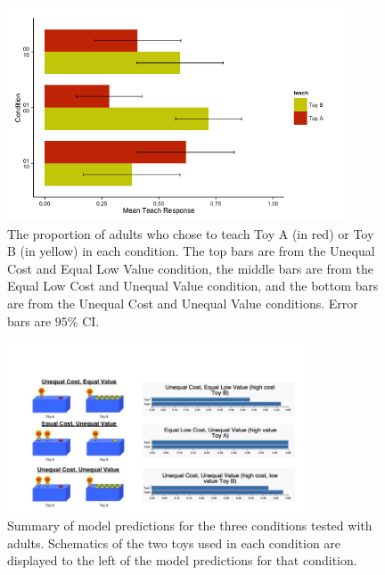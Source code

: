 \documentclass[10pt,letterpaper]{article}
\begin{document}
\begin{figure}[ht]
\begin{center}
\includegraphics[width=10cm]{cleanHorizontalBarplot_n87.png}
\end{center}
\caption{The proportion of adults who chose to teach Toy A (in red) or Toy B (in yellow) in each condition. The top bars are from the Unequal Cost and Equal Low Value condition, the middle bars are from the Equal Low Cost and Unequal Value condition, and the bottom bars are from the Unequal Cost and Unequal Value conditions. Error bars are $95\%$ CI.} 
\label{Figure 1}
\end{figure}

\begin{figure}[ht]
\begin{center}
\includegraphics[width=9cm]{modelPredictions.png}
\end{center}
\caption{Summary of model predictions for the three conditions tested with adults. Schematics of the two toys used in each condition are displayed to the left of the model predictions for that condition.} 
\label{Figure 2}
\end{figure}
\end{document}
